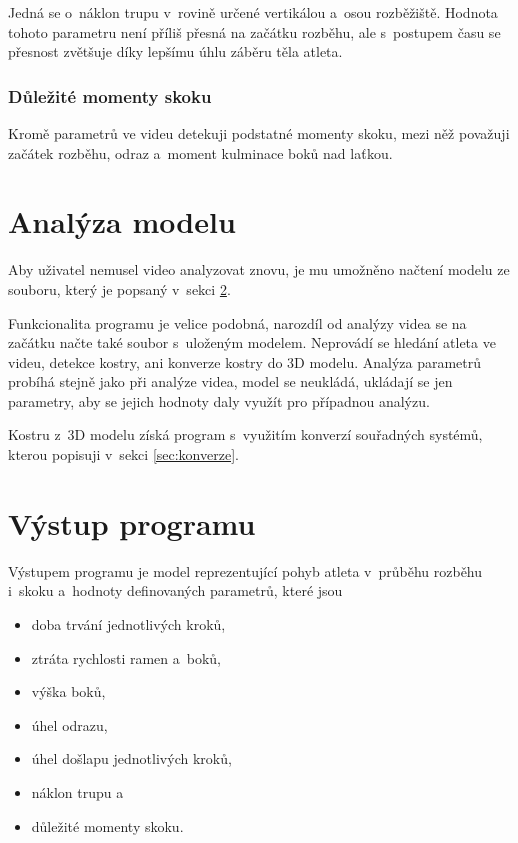 Jedná se o~náklon trupu v~rovině určené vertikálou a~osou rozběžiště. Hodnota tohoto parametru není příliš přesná na začátku rozběhu, ale s~postupem času se přesnost zvětšuje díky lepšímu úhlu záběru těla atleta.


\subsubsection{Důležité momenty skoku}

Kromě parametrů ve videu detekuji podstatné momenty skoku, mezi něž považuji začátek rozběhu, odraz a~moment kulminace boků nad laťkou.




\section{Analýza modelu}

Aby uživatel nemusel video analyzovat znovu, je mu umožněno načtení modelu ze souboru, který je popsaný v~sekci \ref{sec:vystup}.

Funkcionalita programu je velice podobná, narozdíl od analýzy videa se na začátku načte také soubor s~uloženým modelem. Neprovádí se hledání atleta ve videu, detekce kostry, ani konverze kostry do 3D modelu. Analýza parametrů probíhá stejně jako při analýze videa, model se neukládá, ukládají se jen parametry, aby se jejich hodnoty daly využít pro případnou analýzu.

Kostru z~3D modelu získá program s~využitím konverzí souřadných systémů, kterou popisuji v~sekci \ref{sec:konverze}.




\section{Výstup programu}
\label{sec:vystup}

Výstupem programu je model reprezentující pohyb atleta v~průběhu rozběhu i~skoku a~hodnoty definovaných parametrů, které jsou
\begin{itemize}
\item doba trvání jednotlivých kroků,
\item ztráta rychlosti ramen a~boků,
\item výška boků,
\item úhel odrazu,
\item úhel došlapu jednotlivých kroků,
\item náklon trupu a
\item důležité momenty skoku.
\end{itemize}


